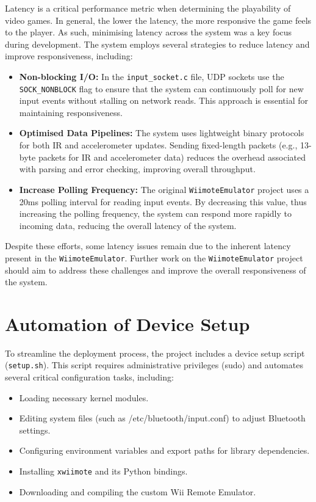 Latency is a critical performance metric when determining the playability of video games. In general, the lower the latency, the more responsive the game feels to the player. As such, minimising latency across the system was a key focus during development. The system employs several strategies to reduce latency and improve responsiveness, including:

\begin{itemize}
	\item \textbf{Non-blocking I/O:} In the \texttt{input\_socket.c} file, UDP
	      sockets use the \texttt{SOCK\_NONBLOCK} flag to ensure that the
	      system can continuously poll for new input events without stalling on network
	      reads. This approach is essential for maintaining responsiveness.

	\item \textbf{Optimised Data Pipelines:} The system uses lightweight binary
	      protocols for both IR and accelerometer updates. Sending fixed-length packets
	      (e.g., 13-byte packets for IR and accelerometer data) reduces the overhead associated
	      with parsing and error checking, improving overall throughput.

	\item \textbf{Increase Polling Frequency:} The original
	      \texttt{WiimoteEmulator} project uses a 20ms polling interval for reading input
	      events. By decreasing this value, thus increasing the polling frequency, the
	      system can respond more rapidly to incoming data, reducing the overall latency
	      of the system.

\end{itemize}

Despite these efforts, some latency issues remain due to the inherent latency present in the \texttt{WiimoteEmulator}. Further work on the \texttt{WiimoteEmulator} project should aim to address these challenges and improve the overall responsiveness of the system.

\section{Automation of Device Setup}

To streamline the deployment process, the project includes a device setup script (\texttt{setup.sh}). This script requires administrative privileges (sudo) and automates several critical configuration tasks, including:

\begin{itemize}

	\item Loading necessary kernel modules.
	\item Editing system files (such as /etc/bluetooth/input.conf) to adjust Bluetooth settings.
	\item Configuring environment variables and export paths for library dependencies.
	\item Installing \texttt{xwiimote} and its Python bindings.
	\item Downloading and compiling the custom Wii Remote Emulator.
\end{itemize}

